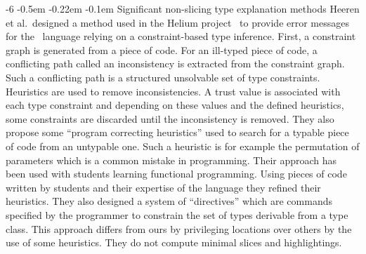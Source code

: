 \documentclass{jfp1}
\makeatletter
\def\subsubsection{\@startsection{subsubsection}{3}{\z@}{-0.2\baselineskip plus -0.1\baselineskip minus -0.1\baselineskip}%
    {-0.5em \@plus -0.22em \@minus -0.1em}{\normalfont\normalsize\bfseries}}%
\newcommand{\sectiontitledot}[1]{#1.}
\renewcommand\subsubsection{\@startsection{subsubsection}{3}{\z@}%
                            {-6\p@ \@plus -1\p@ \@minus -1\p@}%
                            {-0.5em \@plus -0.22em \@minus -0.1em}%
                            {\normalfont\normalsize\bfseries\boldmath\sectiontitledot}}
\makeatother
\begin{document}
\subsubsection{Significant non-slicing type explanation methods}
%
Heeren et al.\ designed a method used in the Helium
project~\cite{Heeren+Jeuring+Swierstra+Alcocer:2002,Hage+Heeren:2005,Heeren:2005,Hage+Heeren:2006}
to provide error messages for the \HASKELL\ language relying on a
constraint-based type inference.  First, a constraint graph is
generated from a piece of code.  For an ill-typed piece of code,
a conflicting path called an inconsistency is extracted from the
constraint graph.  Such a conflicting path is a structured unsolvable
set of type constraints.  Heuristics are used to remove
inconsistencies.  A trust value is associated with each type constraint and
depending on these values and the defined heuristics, some constraints
are discarded until the inconsistency is removed.  They also propose
some ``program correcting heuristics'' used to search for a typable
piece of code from an untypable one.  Such a heuristic is for example
the permutation of parameters which is a common mistake in
programming.  Their approach has been used with
students learning functional programming.  Using pieces of code
written by students and their expertise of the language they refined
their heuristics.
They also designed a system of ``directives'' which
are commands specified by the programmer to constrain the set of types
derivable from a type class.
This approach differs from ours by
privileging locations over others by the use of some heuristics.  They
do not compute minimal slices and highlightings.

\end{document}
